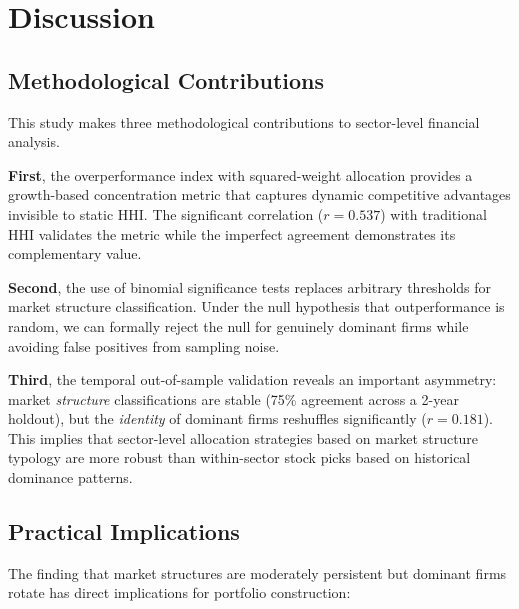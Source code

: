 \documentclass[11pt]{article}
\begin{document}
\section{Discussion}

\subsection{Methodological Contributions}

This study makes three methodological contributions to sector-level financial analysis.

\textbf{First}, the overperformance index with squared-weight allocation provides a growth-based concentration metric that captures dynamic competitive advantages invisible to static HHI. The significant correlation ($r = 0.537$) with traditional HHI validates the metric while the imperfect agreement demonstrates its complementary value.

\textbf{Second}, the use of binomial significance tests replaces arbitrary thresholds for market structure classification. Under the null hypothesis that outperformance is random, we can formally reject the null for genuinely dominant firms while avoiding false positives from sampling noise.

\textbf{Third}, the temporal out-of-sample validation reveals an important asymmetry: market \textit{structure} classifications are stable (75\% agreement across a 2-year holdout), but the \textit{identity} of dominant firms reshuffles significantly ($r = 0.181$). This implies that sector-level allocation strategies based on market structure typology are more robust than within-sector stock picks based on historical dominance patterns.

\subsection{Practical Implications}

The finding that market structures are moderately persistent but dominant firms rotate has direct implications for portfolio construction:
\end{document}

